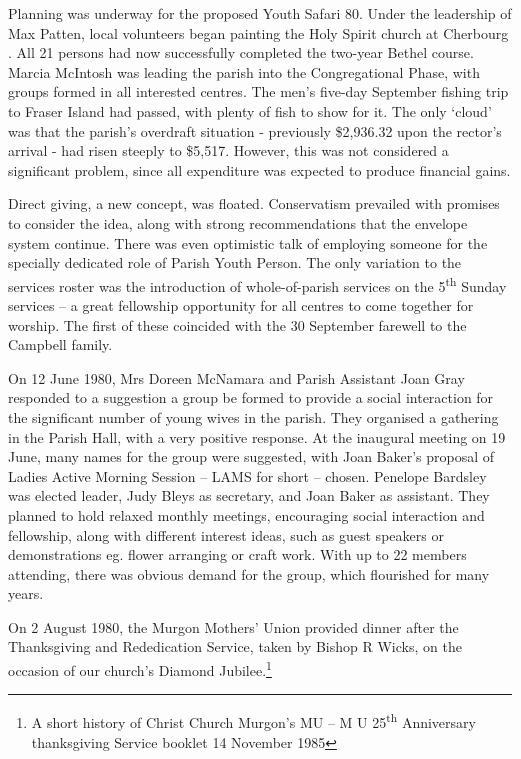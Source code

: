 Planning was underway for the proposed Youth Safari 80. Under the leadership of Max Patten, local volunteers began painting the Holy Spirit church at Cherbourg . All 21 persons had now successfully completed the two-year Bethel course. Marcia McIntosh was leading the parish into the Congregational Phase, with groups formed in all interested centres. The men's five-day September fishing trip to Fraser Island had passed, with plenty of fish to show for it. The only `cloud' was that the parish's overdraft situation - previously \$2,936.32 upon the rector's arrival - had risen steeply to \$5,517. However, this was not considered a significant problem, since all expenditure was expected to produce financial gains.



Direct giving, a new concept, was floated. Conservatism prevailed with promises to consider the idea, along with strong recommendations that the envelope system continue. There was even optimistic talk of employing someone for the specially dedicated role of Parish Youth Person. The only variation to the services roster was the introduction of whole-of-parish services on the 5\textsuperscript{th} Sunday services -- a great fellowship opportunity for all centres to come together for worship. The first of these coincided with the 30 September farewell to the Campbell family.



On 12 June 1980, Mrs Doreen McNamara and Parish Assistant Joan Gray responded to a suggestion a group be formed to provide a social interaction for the significant number of young wives in the parish. They organised a gathering in the Parish Hall, with a very positive response. At the inaugural meeting on 19 June, many names for the group were suggested, with Joan Baker's proposal of Ladies Active Morning Session -- LAMS for short -- chosen. Penelope Bardsley was elected leader, Judy Bleys as secretary, and Joan Baker as assistant. They planned to hold relaxed monthly meetings, encouraging social interaction and fellowship, along with different interest ideas, such as guest speakers or demonstrations eg. flower arranging or craft work. With up to 22 members attending, there was obvious demand for the group, which flourished for many years.



On 2 August 1980, the Murgon Mothers' Union provided dinner after the Thanksgiving and Rededication Service, taken by Bishop R Wicks, on the occasion of our church's Diamond Jubilee.\footnote{A short history of Christ Church Murgon's MU -- M U 25\textsuperscript{th} Anniversary thanksgiving Service booklet 14 November 1985}


